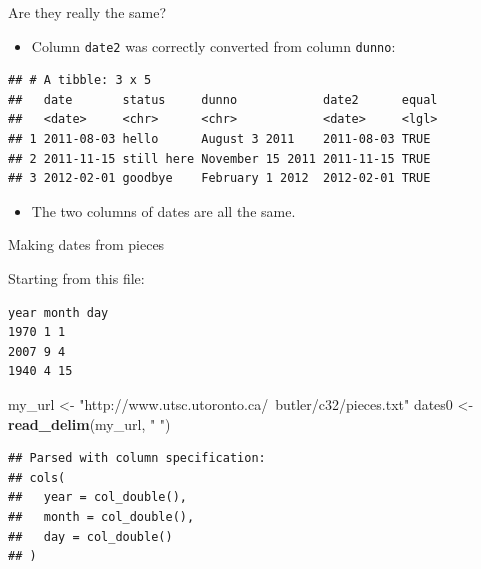 \documentclass[ignorenonframetext,]{beamer}
\newenvironment{Shaded}{\begin{snugshade}}{\end{snugshade}}
\newcommand{\DataTypeTok}[1]{\textcolor[rgb]{0.13,0.29,0.53}{#1}}
\newcommand{\KeywordTok}[1]{\textcolor[rgb]{0.13,0.29,0.53}{\textbf{#1}}}
\newcommand{\NormalTok}[1]{#1}
\newcommand{\OperatorTok}[1]{\textcolor[rgb]{0.81,0.36,0.00}{\textbf{#1}}}
\newcommand{\StringTok}[1]{\textcolor[rgb]{0.31,0.60,0.02}{#1}}
\providecommand{\tightlist}{%
  \setlength{\itemsep}{0pt}\setlength{\parskip}{0pt}}
\begin{document}
\begin{frame}[fragile]{Are they really the same?}
\protect\hypertarget{are-they-really-the-same}{}

\begin{itemize}
\tightlist
\item
  Column \texttt{date2} was correctly converted from column
  \texttt{dunno}:
\end{itemize}

\begin{Shaded}
\end{Shaded}

\begin{verbatim}
## # A tibble: 3 x 5
##   date       status     dunno            date2      equal
##   <date>     <chr>      <chr>            <date>     <lgl>
## 1 2011-08-03 hello      August 3 2011    2011-08-03 TRUE 
## 2 2011-11-15 still here November 15 2011 2011-11-15 TRUE 
## 3 2012-02-01 goodbye    February 1 2012  2012-02-01 TRUE
\end{verbatim}

\begin{itemize}
\tightlist
\item
  The two columns of dates are all the same.
\end{itemize}

\end{frame}

\begin{frame}[fragile]{Making dates from pieces}
\protect\hypertarget{making-dates-from-pieces}{}

Starting from this file:

\begin{verbatim}
year month day
1970 1 1
2007 9 4
1940 4 15
\end{verbatim}

\begin{Shaded}
\begin{Highlighting}[]
\NormalTok{my_url <-}\StringTok{ "http://www.utsc.utoronto.ca/~butler/c32/pieces.txt"}
\NormalTok{dates0 <-}\StringTok{ }\KeywordTok{read_delim}\NormalTok{(my_url, }\StringTok{" "}\NormalTok{)}
\end{Highlighting}
\end{Shaded}

\begin{verbatim}
## Parsed with column specification:
## cols(
##   year = col_double(),
##   month = col_double(),
##   day = col_double()
## )
\end{verbatim}

\end{frame}
\end{document}
